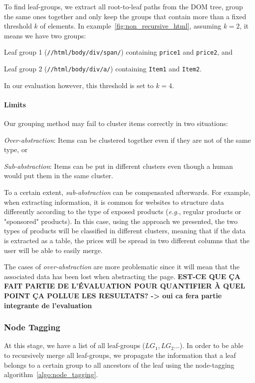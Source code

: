 To find leaf-groups, we extract all root-to-leaf paths from the DOM tree, group the same ones together
and only keep the groups that contain more than a fixed threshold $k$ of elements.
In example~\ref{fig:non_recursive_html}, assuming $k=2$, it means we have two groups:
\begin{compactenum}
  \item Leaf group 1 (\texttt{//html/body/div/span/}) containing \texttt{price1} and \texttt{price2}, and
  \item Leaf group 2 (\texttt{//html/body/div/a/}) containing \texttt{Item1} and \texttt{Item2}.
\end{compactenum}
In our evaluation however, this threshold is set to $k=4$.

\paragraph{Limits}
Our grouping method may fail to cluster items correctly in two situations:
\begin{compactitem}
  \item \emph{Over-abstraction}: Items can be clustered together even if they are not of the same type, or
  \item \emph{Sub-abstraction}: Items can be put in different clusters even though a human would put them in the same cluster.
\end{compactitem}
To a certain extent, \emph{sub-abstraction} can be compensated afterwards.
For example, when extracting information, it is common for websites to structure data differently according to the type of exposed products (\emph{e.g.}, regular products or "sponsored" products). 
In this case, using the approach we presented, the two types of products will be classified in different clusters, meaning that if the data is extracted as a table, the prices will be spread in two different columns that the user will be able to easily merge.

The cases of \emph{over-abstraction} are more problematic since it will mean that the associated data has been lost when abstracting the page.
\textbf{EST-CE QUE ÇA FAIT PARTIE DE L'ÉVALUATION POUR QUANTIFIER À QUEL POINT ÇA POLLUE LES RESULTATS? -> oui ca fera partie integrante de l'evaluation}

\subsubsection{Node Tagging}
\label{sec:node_tagging}
At this stage, we have a list of all leaf-groups ($LG_1, LG_2...$). 
In order to be able to recursively merge all leaf-groups, we propagate the information that a leaf belongs to a certain group to all ancestors of the leaf using the node-tagging algorithm~\ref{algo:node_tagging}.

